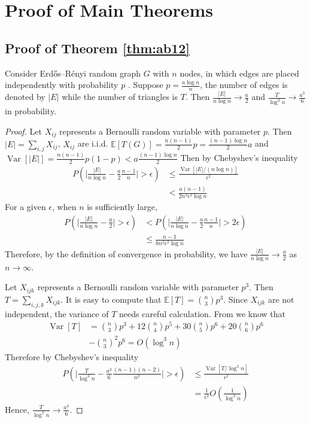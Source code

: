 \documentclass[entropy,article,submit,moreauthors,pdftex]{Definitions/mdpi}
\newcommand{\A}{\frac{a \log n}{n}}
\newcommand{\1}{\mathbbm{1}}
\DeclareMathOperator{\Var}{Var}
\begin{document}
\section{Proof of Main Theorems}\label{sec:pm}
\subsection{Proof of Theorem \ref{thm:ab12}}
\begin{Lemma}\label{lem:ER_tr_counting}
	Consider Erdős–Rényi random graph $G$ with $n$ nodes, in which edges are placed independently with probability $p$ \cite{erdHos1960evolution}. Suppose
	$p=\A$, the number of edges is denoted by $|E|$ while the number of triangles is $T$. Then
	$\frac{|E|}{n \log n} \to \frac{a}{2}$ and $\frac{T}{\log^3 n} \to \frac{a^3}{6}$ in probability.
\end{Lemma}
\begin{proof}
		Let $X_{ij}$ represents a Bernoulli random variable with parameter $p$. Then $|E| = \sum_{i,j} X_{ij}$, $X_{ij}$ are i.i.d.
	$\mathbb{E}[T(G)] = \frac{n(n-1)}{2}p = \frac{(n-1)\log n}{2}a$ and $\Var[|E|] = \frac{n(n-1)}{2} p(1-p) < a\frac{(n-1)\log n}{2}$
	Then by Chebyshev's inequality
	\begin{align*}
	P(\Big|\frac{|E|}{n \log n } - \frac{a}{2} \frac{n-1}{n}\Big| > \epsilon) & \leq
	\frac{\Var[|E| /(n \log n )]}{\epsilon^2} \\
	& < \frac{a(n-1)}{2n^2\epsilon^2\log n}
	\end{align*}
	For a given $\epsilon$, when $n$ is sufficiently large,
	\begin{align*}
	P(\Big|\frac{|E|}{n \log n } - \frac{a}{2} \Big| > \epsilon) & <
	P(\Big|\frac{|E|}{n \log n } - \frac{a}{2} \frac{n-1}{n}\Big| > 2\epsilon) \\
	& \leq \frac{n-1}{8n^2 \epsilon^2 \log n}
	\end{align*}
	Therefore, by the definition of convergence in probability, we have $\frac{|E|}{n \log n} \to \frac{a}{2}$ as $n\to \infty$.
	
	Let $X_{ijk}$ represents a Bernoulli random variable with parameter $p^3$.
	Then $T = \sum_{i,j,k} X_{ijk}$.
	It is easy to compute that $\mathbb{E}[T] = \binom{n}{3}p^3$. Since $X_{ijk}$ are not independent, the variance of $T$ needs careful calculation.
	From \cite{holland1977method} we know that
	\begin{align*}
	\Var[T] & = \binom{n}{3} p^3 + 12 \binom{n}{4} p^5 + 30 \binom{n}{5} p^6 + 20 \binom{n}{6} p^6\\
	 &- \binom{n}{3}^2 p^6   = O(\log^3 n)
	\end{align*}
	Therefore
	by Chebyshev's inequality
	\begin{align*}
	P(\Big|\frac{T}{\log^3 n } - \frac{a^3}{6} \frac{(n-1)(n-2)}{n^2}\Big| > \epsilon) &\leq \frac{\Var[T /\log^3 n ]}{\epsilon^2} \\ 
	& = \frac{1}{\epsilon^2}O(\frac{1}{\log^3 n})
	\end{align*}
	Hence, $\frac{T}{\log^3 n} \to \frac{a^3}{6}$.
\end{proof}
\end{document}

